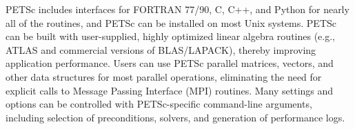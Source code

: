 PETSc includes interfaces for FORTRAN 77/90, C, C++, and Python for
nearly all of the routines, and PETSc can be installed on most Unix
systems. PETSc can be built with user-supplied, highly optimized
linear algebra routines (e.g., ATLAS and commercial versions of
BLAS/LAPACK), thereby improving application performance. Users can use
PETSc parallel matrices, vectors, and other data structures for most
parallel operations, eliminating the need for explicit calls to
Message Passing Interface (MPI) routines. Many settings and options
can be controlled with PETSc-specific command-line arguments,
including selection of preconditions, solvers, and generation of
performance logs.
